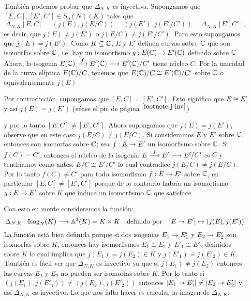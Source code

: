 También podemos probar que $\Delta_{N,K}$ es inyectiva. Supongamos que $[E,C],[E',C']\in S_0(N)(K)$ tales que
\[
	\Delta_{N,K}[E,C]=(j(E),j(E/C))=(j(E'),j(E'/C'))=\Delta_{N,K}[E',C'],
\]
es decir, que $j(E)\neq j(E')$ o $j(E/C)\neq j(E'/C')$. Para esto supongamos que $j(E)=j(E')$. Como $K\subseteq\mathbb{C}$, $E$ y $E'$ definen curvas sobre $\mathbb{C}$ que son isomorfas sobre $\mathbb{C}$, i.e. hay un isomorfismo $g:E(\mathbb{C})\rightarrow E'(\mathbb{C})$ definido sobre $\mathbb{C}$. Ahora, la isogenia $E(\mathbb{C})\overset{f}{\longrightarrow} E'(\mathbb{C})\longrightarrow E'(\mathbb{C})/C'$ tiene núcleo $C$. Por la unicidad de la curva elíptica $E(\mathbb{C})/C$, tenemos que $E(\mathbb{C})/C\cong E'(\mathbb{C})/C'$ sobre $\mathbb{C}$ o equivalentemente $j(E)$

Por contradicción, supongamos que $[E,C]=[E',C']$. Esto significa que $E\cong E'$ y así $j(E)=j(E')$ (véase el pie de página ${}^{\ref{footnote-j-inv}}$)



 y por lo tanto $[E,C]\neq[E',C']$. Ahora supongamos que $j(E)=j(E')$, observe que en este caso $j(E/C)\neq j(E/C)$. Si consideramos $E$ y $E'$ sobre $\mathbb{C}$, entonces son isomorfas sobre $\mathbb{C}$; sea $f:E\rightarrow E'$ un isomorfismo sobre $\mathbb{C}$. Si $f(C)=C'$, entonces el núcleo de la isogenia $E\overset{f}{\longrightarrow} E'\longrightarrow E'/C'$ es $C$ y tendríamos como antes: $E/C\cong E'/C'$ lo cual contradice $j(E/C)\neq j(E/C)$. Por lo tanto $f(C)\neq C'$ para todo isomorfismo $f:E\rightarrow E'$ sobre $\mathbb{C}$, en particular $[E,C]\neq[E',C']$ porque de lo contrario habría un isomorfismo $g:E\rightarrow E'$ sobre $K$ que induce un isomorfismo $\mathbb{C}$ que satisface 


Con esto en mente consideremos la función:
\[
	\Delta_{N,K}: \mathrm{Isog}_N(K)\longrightarrow \mathbb{A}^2(K)=K\times K\quad\text{definido por}\quad [E\rightarrow E']\mapsto(j(E),j(E')).
\]
La función está bien definida porque si dos isogenias $E_1\rightarrow E'_1$ y $E_2\rightarrow E'_2$ son isomorfas sobre $K$, entonces hay isomorfismos $E_1\cong E_2$ y $E'_1\cong E'_2$ definidos sobre $K$ lo cual implica que $j(E_1)=j(E_2)\in K$ y $j(E'_1)=j(E'_2)\in K$. También es fácil ver que $\Delta_{N,K}$ es inyectivo ya que si $j(E_1)\neq j(E_2)$ entonces las curvas $E_1$ y $E_2$ no pueden ser isomorfas sobre $K$. Por lo tanto si $(j(E_1),j(E'_1))\neq(j(E_2),j(E'_2))$ entonces $[E_1\rightarrow E'_1]\neq[E_2\rightarrow E'_2]$ y así $\Delta_{N,K}$ es inyectivo. Lo que nos falta hacer es calcular la imagen de $\Delta_{N,K}$.

